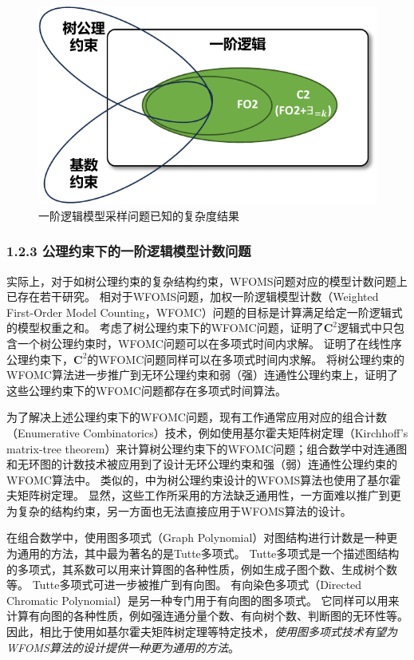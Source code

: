 \documentclass[12pt,UTF8,AutoFakeBold=3,a4paper]{ctexart} %
\newcommand{\ctwo}{\ensuremath{\mathbf{C}^2}}
\begin{document}
\begin{figure}[tbp]
  \centering
  \includegraphics[width=.5\textwidth]{figs/hardness_results.pdf}
  \caption{一阶逻辑模型采样问题已知的复杂度结果}
  \label{fig:hardness_results}
\end{figure}

\subsubsection{1.2.3 公理约束下的一阶逻辑模型计数问题}

实际上，对于如树公理约束的复杂结构约束，WFOMS问题对应的模型计数问题上已存在若干研究。
相对于WFOMS问题，加权一阶逻辑模型计数（Weighted First-Order Model Counting，WFOMC）问题的目标是计算满足给定一阶逻辑式的模型权重之和。
考虑了树公理约束下的WFOMC问题，证明了\ctwo{}逻辑式中只包含一个树公理约束时，WFOMC问题可以在多项式时间内求解。
证明了在线性序公理约束下，\ctwo{}的WFOMC问题同样可以在多项式时间内求解。
将树公理约束的WFOMC算法进一步推广到无环公理约束和弱（强）连通性公理约束上，证明了这些公理约束下的WFOMC问题都存在多项式时间算法。

为了解决上述公理约束下的WFOMC问题，现有工作通常应用对应的组合计数（Enumerative Combinatorics）技术，例如使用基尔霍夫矩阵树定理（Kirchhoff's matrix-tree theorem）来计算树公理约束下的WFOMC问题；组合数学中对连通图和无环图的计数技术被应用到了设计无环公理约束和强（弱）连通性公理约束的WFOMC算法中。
类似的，中为树公理约束设计的WFOMS算法也使用了基尔霍夫矩阵树定理。
显然，这些工作所采用的方法缺乏通用性，一方面难以推广到更为复杂的结构约束，另一方面也无法直接应用于WFOMS算法的设计。

在组合数学中，使用图多项式（Graph Polynomial）对图结构进行计数是一种更为通用的方法，其中最为著名的是Tutte多项式。
Tutte多项式是一个描述图结构的多项式，其系数可以用来计算图的各种性质，例如生成子图个数、生成树个数等。
Tutte多项式可进一步被推广到有向图。
有向染色多项式（Directed Chromatic Polynomial）是另一种专门用于有向图的图多项式。
它同样可以用来计算有向图的各种性质，例如强连通分量个数、有向树个数、判断图的无环性等。
因此，相比于使用如基尔霍夫矩阵树定理等特定技术，\emph{使用图多项式技术有望为WFOMS算法的设计提供一种更为通用的方法}。
\end{document}
